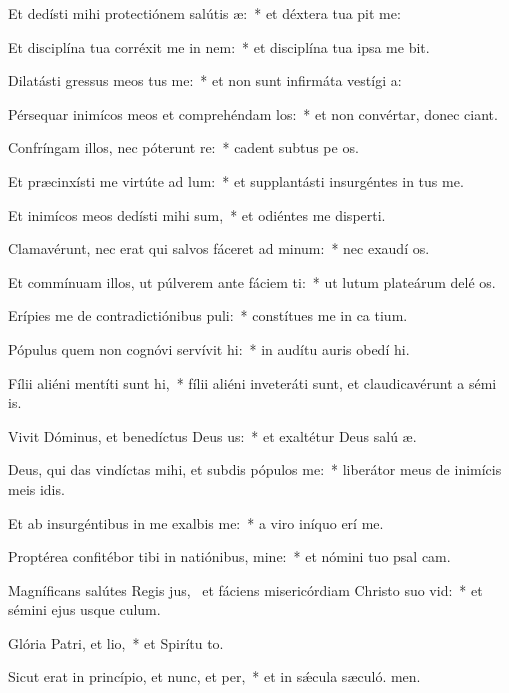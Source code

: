 \item Et dedísti mihi protectiónem salútis æ:~* et déxtera tua pit me:
\item Et disciplína tua corréxit me in nem:~* et disciplína tua ipsa me bit.
\item Dilatásti gressus meos tus me:~* et non sunt infirmáta vestígi a:
\item Pérsequar inimícos meos et comprehéndam los:~* et non convértar, donec ciant.
\item Confríngam illos, nec póterunt re:~* cadent subtus pe os.
\item Et præcinxísti me virtúte ad lum:~* et supplantásti insurgéntes in  tus me.
\item Et inimícos meos dedísti mihi sum,~* et odiéntes me disperti.
\item Clamavérunt, nec erat qui salvos fáceret ad minum:~* nec exaudí os.
\item Et commínuam illos, ut púlverem ante fáciem ti:~* ut lutum plateárum delé os.
\item Erípies me de contradictiónibus puli:~* constítues me in ca tium.
\item Pópulus quem non cognóvi servívit hi:~* in audítu auris obedí hi.
\item Fílii aliéni mentíti sunt hi,~* fílii aliéni inveteráti sunt, et claudicavérunt a sémi is.
\item Vivit Dóminus, et benedíctus Deus us:~* et exaltétur Deus salú æ.
\item Deus, qui das vindíctas mihi, et subdis pópulos  me:~* liberátor meus de inimícis meis idis.
\item Et ab insurgéntibus in me exalbis me:~* a viro iníquo erí me.
\item Proptérea confitébor tibi in natiónibus, mine:~* et nómini tuo psal cam.
\item Magníficans salútes Regis jus,~\pscross{} et fáciens misericórdiam Christo suo vid:~* et sémini ejus usque  culum.
\item Glória Patri, et lio,~* et Spirítu to.
\item Sicut erat in princípio, et nunc, et per,~* et in sǽcula sæculó. men.
